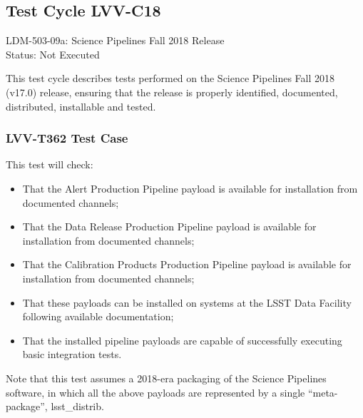 \documentclass[DM,lsstdraft,STR,toc]{lsstdoc}
\providecommand{\tightlist}{
  \setlength{\itemsep}{0pt}\setlength{\parskip}{0pt}}
\begin{document}
\subsection{Test Cycle LVV-C18}

LDM-503-09a: Science Pipelines Fall 2018 Release\\
Status: Not Executed


This test cycle describes tests performed on the Science Pipelines Fall
2018 (v17.0) release, ensuring that the release is properly identified,
documented, distributed, installable and tested.



\subsubsection{LVV-T362 Test Case}

This test will check:

\begin{itemize}
\tightlist
\item
  That the Alert Production Pipeline payload is available for
  installation from documented channels;
\item
  That the Data Release Production Pipeline payload is available for
  installation from documented channels;
\item
  That the Calibration Products Production Pipeline payload is available
  for installation from documented channels;
\item
  That these payloads can be installed on systems at the LSST Data
  Facility following available documentation;
\item
  That the installed pipeline payloads are capable of successfully
  executing basic integration tests.
\end{itemize}

Note that this test assumes a 2018-era packaging of the Science
Pipelines software, in which all the above payloads are represented by a
single ``meta-package'', lsst\_distrib.
\end{document}
